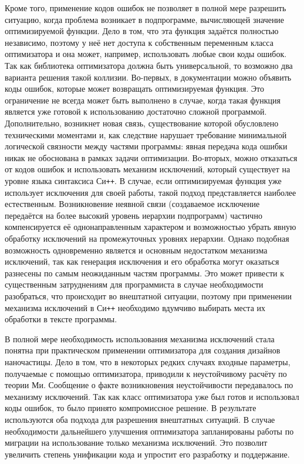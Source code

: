 Кроме того, применение кодов ошибок не позволяет в полной мере
разрешить ситуацию, когда проблема возникает в подпрограмме,
вычисляющей значение оптимизируемой функции. Дело в том, что эта
функция задаётся полностью независимо, поэтому у неё нет доступа к
собственным переменным класса оптимизатора и она может, например,
использовать любые свои коды ошибок. Так как библиотека оптимизатора
должна быть универсальной, то возможно два варианта решения такой
коллизии. Во-первых, в документации можно объявить коды ошибок,
которые может возвращать оптимизируемая функция. Это ограничение не
всегда может быть выполнено в случае, когда такая функция является
уже готовой к использованию достаточно сложной
программой. Дополнительно, возникнет новая связь, существование
которой обусловлено техническими моментами и, как следствие нарушает
требование минимальной логической связности между частями программы:
явная передача кода ошибки никак не обоснована в рамках задачи
оптимизации.  Во-вторых, можно отказаться от кодов ошибок и
использовать механизм исключений, который существует на уровне языка
синтаксиса Си\texttt{++}.  В случае, если оптимизируемая функция уже
использует исключения для своей работы, такой подход представляется
наиболее естественным.  Возникновение неявной связи (создаваемое
исключение передаётся на более высокий уровень иерархии подпрограмм)
частично компенсируется её однонаправленным характером и
возможностью убрать явную обработку исключений на промежуточных уровнях
иерархии.  Однако подобная возможность одновременно является и
основным недостатком механизма исключений, так как генерация
исключения и его обработка могут оказаться разнесены по самым
неожиданным частям программы.  Это может привести к существенным
затруднениям для программиста в случае необходимости разобраться, что
происходит во внештатной ситуации, поэтому при применении механизма
исключений в Си\texttt{++} необходимо вдумчиво выбирать места их
обработки в тексте программы.

В полной мере необходимость использования механизма исключений стала
понятна при практическом применении оптимизатора для создания дизайнов
наночастицы.  Дело в том, что в некоторых редких случаях входные
параметры, получаемые с помощью оптимизатора, приводили к
неустойчивому расчёту по теории Ми. Сообщение о факте возникновения
неустойчивости передавалось по механизму исключений. Так как класс
оптимизатора уже был готов и использовал коды ошибок, то было принято
компромиссное решение. В результате используются
оба подхода для разрешения внештатных ситуаций. В случае
необходимости дальнейшего улучшения оптимизатора запланированы работы
по миграции на использование только механизма исключений. Это позволит
увеличить степень унификации кода и упростит его разработку и
поддержание.

